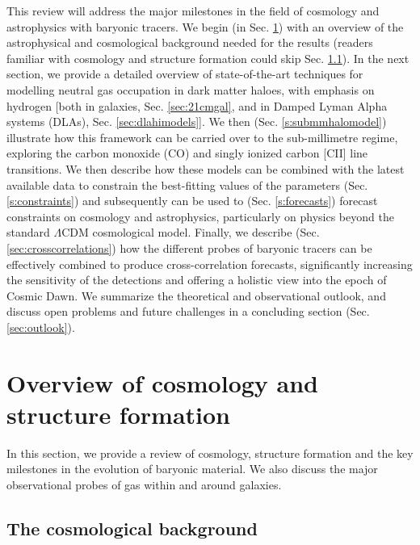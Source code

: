 This review will address the major milestones in the field of cosmology and astrophysics with baryonic tracers. We begin (in Sec. \ref{sec:astrocosmo}) with an overview of the astrophysical and cosmological background needed for the results (readers familiar with cosmology and structure formation could skip Sec. \ref{sec:introcosmo}). In the next section, we provide a detailed overview of state-of-the-art techniques for modelling neutral gas occupation in dark matter haloes, with emphasis on hydrogen [both in galaxies, Sec. \ref{sec:21cmgal}, and in Damped Lyman Alpha systems (DLAs), Sec. \ref{sec:dlahimodels}]. We then (Sec. \ref{s:submmhalomodel}) illustrate how this framework can be carried over to the sub-millimetre regime, exploring the carbon monoxide (CO) and singly ionized carbon [CII] line transitions. We then describe how these models can be combined with the latest available data to constrain the best-fitting values of the parameters (Sec. \ref{s:constraints}) and subsequently can be used to (Sec. \ref{s:forecasts})  forecast constraints on cosmology and astrophysics, particularly on physics beyond the standard $\Lambda$CDM cosmological model. Finally, we describe (Sec. \ref{sec:crosscorrelations}) how the different probes of baryonic tracers can be effectively combined to produce cross-correlation forecasts, significantly increasing the sensitivity of the detections and offering a holistic view into the epoch of Cosmic Dawn.  We summarize the theoretical and observational outlook, and discuss open problems and future challenges in a concluding section (Sec. \ref{sec:outlook}). 

\section{Overview of cosmology and structure formation}
\label{sec:astrocosmo}
In this section, we provide a review of cosmology, structure formation and the key milestones in the evolution of baryonic material. We also discuss the major observational probes of gas within and around galaxies.
\subsection{The cosmological background}
\label{sec:introcosmo}

